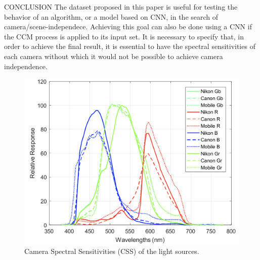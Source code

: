 \begin{frame}{CONCLUSION}
    The dataset proposed in this paper is useful for testing the behavior of 
    an algorithm, or a model based on CNN, in the search of camera/scene-independece. 
    Achieving this goal can also be done using a CNN if the CCM process is 
    applied to its input set. It is necessary to specify that, in order to 
    achieve the final result, it is essential to have the spectral sensitivities of each camera 
    without which it would not be possible to achieve camera independence.
    \begin{figure}[htbp]
        \centering
        \includegraphics[width = 0.5 \linewidth]{images/paper4/CSS.png}
        \centering
        \caption{Camera Spectral Sensitivities (CSS) of the light sources.}
        \label{fig:CNNtec1}
    \end{figure}
\end{frame}